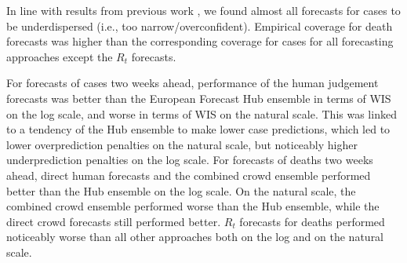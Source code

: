 \documentclass[10pt,a4paper,twocolumn]{article}
\begin{document}
In line with results from previous work \citep{bosseComparingHumanModelbased2022, sherrattPredictivePerformanceMultimodel2022}, we found almost all forecasts for cases to be underdispersed (i.e., too narrow/overconfident). Empirical coverage for death forecasts was higher than the corresponding coverage for cases for all forecasting approaches except the $R_t$ forecasts. 

For forecasts of cases two weeks ahead, performance of the human judgement forecasts was better than the European Forecast Hub ensemble in terms of WIS on the log scale, and worse in terms of WIS on the natural scale. This was linked to a tendency of the Hub ensemble to make lower case predictions, which led to lower overprediction penalties on the natural scale, but noticeably higher underprediction penalties on the log scale. 
For forecasts of deaths two weeks ahead, direct human forecasts and the combined crowd ensemble performed better than the Hub ensemble on the log scale. On the natural scale, the combined crowd ensemble performed worse than the Hub ensemble, while the direct crowd forecasts still performed better. $R_t$ forecasts for deaths performed noticeably worse than all other approaches both on the log and on the natural scale. 
\end{document}
